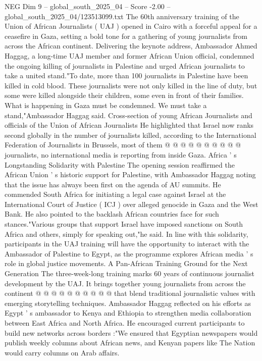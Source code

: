 \begin{textsample}{NEG Dim 9 – global\_south\_2025\_04 – Score -2.00 – global\_south\_2025\_04/123513099.txt}  \label{ex:f9_neg_271}
The 60th anniversary training of the Union of African Journalists ( UAJ ) opened in Cairo with a forceful appeal for a ceasefire in Gaza, setting a bold tone for a gathering of young journalists from across the African continent.
Delivering the keynote address, Ambassador Ahmed Haggag, a long-time UAJ member and former African Union official, condemned the ongoing killing of journalists in Palestine and urged African journalists to take a united stand."To date, more than 100 journalists in Palestine have been killed in cold blood.
These journalists were not only killed in the line of duty, but some were killed alongside their children, some even in front of their families.
What is happening in Gaza must be condemned.
We must take a stand,"Ambassador Haggag said.
Cross-section of young African Journalists and officials of the Union of African Journalists He highlighted that Israel now ranks second globally in the number of journalists killed, according to the International Federation of Journalists in Brussels, most of them @ @ @ @ @ @ @ @ @ @ journalists, no international media is reporting from inside Gaza.
Africa ' s Longstanding Solidarity with Palestine The opening session reaffirmed the African Union ' s historic support for Palestine, with Ambassador Haggag noting that the issue has always been first on the agenda of AU summits.
He commended South Africa for initiating a legal case against Israel at the International Court of Justice ( ICJ ) over alleged genocide in Gaza and the West Bank.
He also pointed to the backlash African countries face for such stances."Various groups that support Israel have imposed sanctions on South Africa and others, simply for speaking out,"he said.
In line with this solidarity, participants in the UAJ training will have the opportunity to interact with the Ambassador of Palestine to Egypt, as the programme explores African media ' s role in global justice movements.
A Pan-African Training Ground for the Next Generation The three-week-long training marks 60 years of continuous journalist development by the UAJ.
It brings together young journalists from across the continent @ @ @ @ @ @ @ @ @ @ that blend traditional journalistic values with emerging storytelling techniques.
Ambassador Haggag reflected on his efforts as Egypt ' s ambassador to Kenya and Ethiopia to strengthen media collaboration between East Africa and North Africa.
He encouraged current participants to build new networks across borders :"We ensured that Egyptian newspapers would publish weekly columns about African news, and Kenyan papers like The Nation would carry columns on Arab affairs.

\end{textsample}
